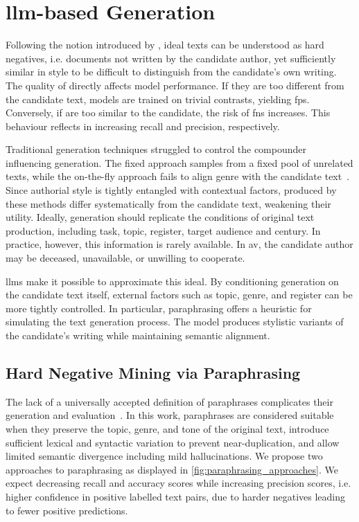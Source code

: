 \section{\acs{llm}-based \Imp{} Generation}
\label{sec:impostor_generation}

Following the notion introduced by \citet{koppel_determining_2014}, ideal \imp{} texts can be understood as hard negatives, i.e. documents not written by the candidate author, yet sufficiently similar in style to be difficult to distinguish from the candidate's own writing. 
The quality of \imps{} directly affects model performance.
If they are too different from the candidate text, models are trained on trivial contrasts, yielding \acp{fp}. 
Conversely, if \imps{} are too similar to the candidate, the risk of \acp{fn} increases.
This behaviour reflects in increasing recall and precision, respectively.

Traditional \imp{} generation techniques struggled to control the compounder influencing \imp{} generation. 
The fixed approach samples from a fixed pool of unrelated texts, while the on-the-fly approach fails to align genre with the candidate text~\citep{koppel_determining_2014}. 
Since authorial style is tightly entangled with contextual factors, \imps{} produced by these methods differ systematically from the candidate text, weakening their utility. 
Ideally, \imp{} generation should replicate the conditions of original text production, including task, topic, register, target audience and century. 
In practice, however, this information is rarely available.
In \ac{av}, the candidate author may be deceased, unavailable, or unwilling to cooperate.

\acp{llm} make it possible to approximate this ideal. 
By conditioning generation on the candidate text itself, external factors such as topic, genre, and register can be more tightly controlled. 
In particular, paraphrasing offers a heuristic for simulating the text generation process. 
The model produces stylistic variants of the candidate's writing while maintaining semantic alignment.


\subsection{Hard Negative Mining via Paraphrasing}

The lack of a universally accepted definition of paraphrases complicates their generation and evaluation~\citep{gohsen_task_oriented_2024}. 
In this work, paraphrases are considered suitable \imps{} when they preserve the topic, genre, and tone of the original text, introduce sufficient lexical and syntactic variation to prevent near-duplication, and allow limited semantic divergence including mild hallucinations.
We propose two approaches to paraphrasing as displayed in \autoref{fig:paraphrasing_approaches}.
We expect decreasing \impAppr{} recall and accuracy scores while increasing \impAppr{} precision scores, i.e. higher confidence in positive labelled text pairs, due to harder negatives leading to fewer positive predictions.

